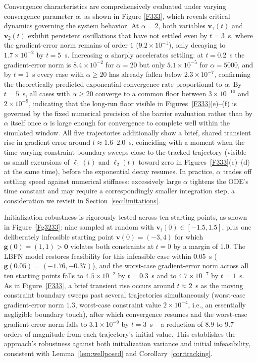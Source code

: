 \documentclass[fleqn,10pt]{wlscirep}
\begin{document}
Convergence characteristics are comprehensively evaluated under varying convergence parameter $\alpha$, as shown in Figure \ref{F333}, which reveals critical dynamics governing the system behavior. At $\alpha=2$, both variables $\bm{v}_1(t)$ and $\bm{v}_2(t)$ exhibit persistent oscillations that have not settled even by $t=3$~s, where the gradient-error norm remains of order $1$ ($9.2\times10^{-1}$), only decaying to $1.7\times10^{-2}$ by $t=5$~s. Increasing $\alpha$ sharply accelerates settling: at $t=0.2$~s the gradient-error norm is $8.4\times10^{-2}$ for $\alpha=20$ but only $5.1\times10^{-5}$ for $\alpha=5000$, and by $t=1$~s every case with $\alpha\geq20$ has already fallen below $2.3\times10^{-7}$, confirming the theoretically predicted exponential convergence rate proportional to $\alpha$. By $t=5$~s, all cases with $\alpha\geq20$ converge to a common floor between $3\times10^{-10}$ and $2\times10^{-9}$, indicating that the long-run floor visible in Figures~\ref{F333}(e)--(f) is governed by the fixed numerical precision of the barrier evaluation rather than by $\alpha$ itself once $\alpha$ is large enough for convergence to complete well within the simulated window. All five trajectories additionally show a brief, shared transient rise in gradient error around $t\approx1.6$--$2.0$~s, coinciding with a moment when the time-varying constraint boundary sweeps close to the tracked trajectory (visible as small excursions of $\ell_1(t)$ and $\ell_2(t)$ toward zero in Figures~\ref{F333}(c)--(d) at the same time), before the exponential decay resumes. In practice, $\alpha$ trades off settling speed against numerical stiffness: excessively large $\alpha$ tightens the ODE's time constant and may require a correspondingly smaller integration step, a consideration we revisit in Section~\ref{sec:limitations}.

Initialization robustness is rigorously tested across ten starting points, as shown in Figure~\ref{Fg3233}: nine sampled at random with $\bm{v}_i(0)\in[-1.5,1.5]$, plus one deliberately infeasible starting point $\bm{v}(0)=(-3,4)$ for which $\bm{g}(0)=(1,1)>\bm{0}$ violates both constraints at $t=0$ by a margin of $1.0$. The LBFN model restores feasibility for this infeasible case within $0.05$~s ($\bm{g}(0.05)=(-1.76,-0.37)$), and the worst-case gradient-error norm across all ten starting points falls to $4.5\times10^{-2}$ by $t=0.3$~s and to $4.7\times10^{-7}$ by $t=1$~s. As in Figure~\ref{F333}, a brief transient rise occurs around $t\approx2$~s as the moving constraint boundary sweeps past several trajectories simultaneously (worst-case gradient-error norm $1.3$, worst-case constraint value $2\times10^{-4}$, i.e., an essentially negligible boundary touch), after which convergence resumes and the worst-case gradient-error norm falls to $3.1\times10^{-9}$ by $t=3$~s -- a reduction of $8.9$ to $9.7$ orders of magnitude from each trajectory's initial value. This establishes the approach's robustness against both initialization variance and initial infeasibility, consistent with Lemma~\ref{lem:wellposed} and Corollary~\ref{cor:tracking}.
\end{document}
